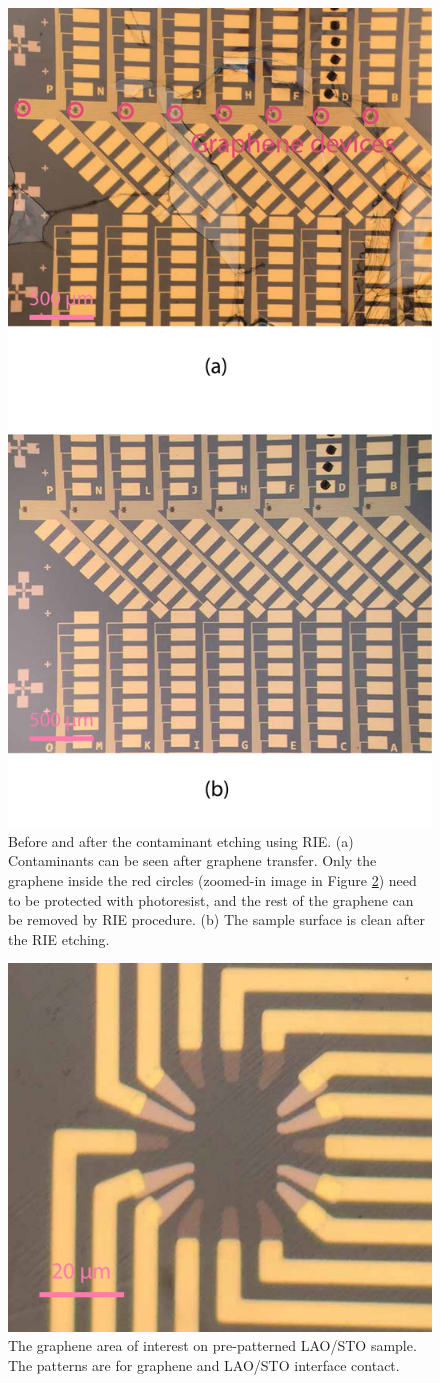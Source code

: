 \documentclass[pdflatex, sectionletters, 12pt]{pittetd}    %
\begin{document}
\begin{figure}[p]
	\centering
	\includegraphics[width=.55\textwidth]{Drawing/SampleContaminant.pdf}
	\caption{Before and after the contaminant etching using RIE. (a) Contaminants can be seen after graphene transfer. Only the graphene inside the red circles (zoomed-in image in Figure \ref{FIG:RIEBeforeEtching}) need to be protected with photoresist, and the rest of the graphene can be removed by RIE procedure. (b) The sample surface is clean after the RIE etching.}
	\label{FIG:SampleContaminant}
\end{figure}

\begin{figure}[h!]
	\centering
	\includegraphics[width=.5\textwidth]{Drawing/RIEBeforeEtching.pdf}
	\caption{The graphene area of interest on pre-patterned LAO/STO sample. The patterns are for graphene and LAO/STO interface contact.}
	\label{FIG:RIEBeforeEtching}
\end{figure}
\end{document}
